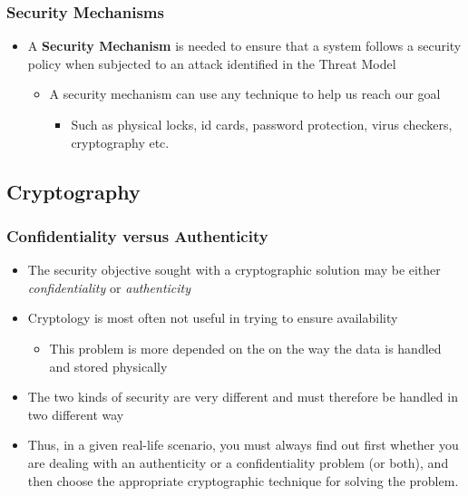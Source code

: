 \documentclass[11pt]{article}
\begin{document}
\subsubsection{Security Mechanisms}
\label{sec:org09b2569}
\begin{itemize}
\item A \textbf{\textbf{Security Mechanism}} is needed to ensure that a system follows a security policy when subjected to an attack identified in the Threat Model
\begin{itemize}
\item A security mechanism can use any technique to help us reach our goal
\begin{itemize}
\item Such as physical locks, id cards, password protection, virus checkers, cryptography etc.
\end{itemize}
\end{itemize}
\end{itemize}

\subsection{Cryptography}
\label{sec:orgea25673}
\subsubsection{Confidentiality versus Authenticity}
\label{sec:orgd184316}
\begin{itemize}
\item The security objective sought with a cryptographic  solution may be either \emph{confidentiality} or \emph{authenticity}
\item Cryptology is most often not useful in trying to ensure availability
\begin{itemize}
\item This problem is more depended on the on the way the data is handled and stored physically
\end{itemize}
\item The two kinds of security are very different and must therefore be handled in two different way
\item Thus, in a given real-life scenario, you must always find out first whether you are dealing with an authenticity or a confidentiality problem (or both), and then choose the appropriate cryptographic technique for solving the problem.
\end{itemize}
\end{document}
